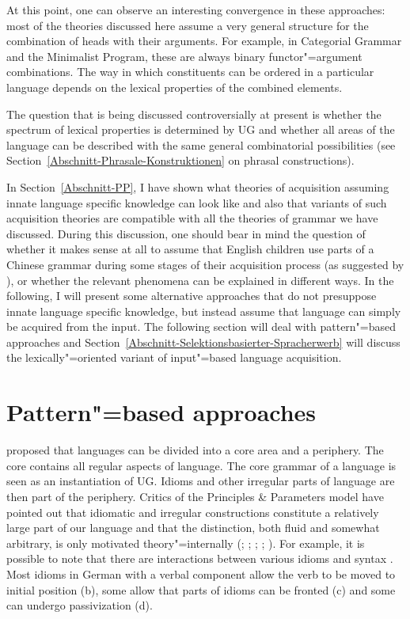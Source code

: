 At this point, one can observe an interesting convergence in these approaches: most of the theories discussed here assume a very
general structure for the combination of heads with their arguments. For example, in Categorial Grammar and the Minimalist Program,
these are always binary functor"=argument combinations. The way in which constituents can be ordered in a particular language depends
on the lexical properties of the combined elements.

The question that is being discussed controversially at present is whether the spectrum of lexical properties is determined by UG 
\citep[--7]{Chomsky2007a} and whether all areas of the language can be described with the same general combinatorial possibilities (see Section~\ref{Abschnitt-Phrasale-Konstruktionen} on phrasal constructions).

In Section~\ref{Abschnitt-PP}, I have shown what theories of acquisition assuming innate language
specific knowledge can look like and also that variants of such acquisition theories are compatible
with all the theories of grammar we have discussed.  During this discussion, one should bear in
 mind the question of whether it makes sense at all to assume that English children
use parts of a Chinese grammar during some stages of their acquisition process (as suggested by
\citealp[]{Yang2004a}), or whether the relevant phenomena can be explained in different ways.
In the following, I will present some alternative approaches that do not presuppose innate language
specific knowledge, but instead assume that language can simply be acquired from the input. The
following section will deal with pattern"=based approaches and
Section~\ref{Abschnitt-Selektionsbasierter-Spracherwerb} will discuss the lexically"=oriented variant
of input"=based language acquisition.

\section{Pattern"=based approaches}
\label{Abschnitt-musterbasiert}

\largerpage
\mbox{}\citet[--8]{Chomsky81a} proposed that languages can be divided into a core
area and a periphery. The core contains all regular aspects of
language. The core grammar of a language is seen as an instantiation of UG. Idioms and
other irregular parts of language are then part of the periphery.  Critics of the Principles \&
Parameters model have pointed out that idiomatic and irregular constructions constitute a relatively
large part of our language and that the distinction, both fluid and somewhat arbitrary, is only
motivated theory"=internally (\citealp[Chapter~7]{Jackendoff97a}; \citealp{Culicover99a-u};
\citealp[]{GSag2000a-u}; \citealp[]{Newmeyer2005a}; \citealp[]{Kuhn2007a}).
For example, it is possible to note that there are interactions between various idioms and syntax
\citep*{NSW94a}.  Most idioms in German with a verbal component allow the verb to be moved to
initial position (b), some allow that parts of idioms can be fronted (c) and some can
undergo passivization (d).

